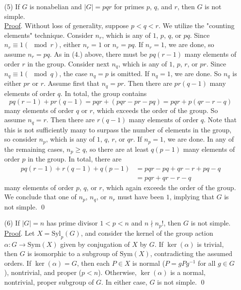 \documentclass[11pt]{amsart}
\theoremstyle{definition}
\renewenvironment{proof}{\underline{Proof}.}{\qed}
\renewcommand\geq{\geqslant}
\renewcommand\:{\colon}
\newcommand{\1}{\mathds{1}}
\newcommand{\Syl}{\text{Syl}}
\newcommand{\Sym}{\text{Sym}}
\begin{document}
\begin{enumerate}[leftmargin=*]
\begin{proof}
\end{proof}
\item[(5)] If $G$ is nonabelian and $|G| = pqr$ for primes $p$, $q$, and $r$, then $G$ is not simple. \\
\begin{proof}
	Without loss of generality, suppose $p < q < r$. We utilize the "counting elements" technique. Consider $n_r$, which is any of $1$, $p$, $q$, or $pq$. Since $n_r \equiv 1 (\mod r)$, either $n_r = 1$ or $n_r = pq$. If $n_r = 1$, we are done, so assume $n_r = pq$. As in (4.) above, there must be $pq(r-1)$ many elements of order $r$ in the group. Consider next $n_q$, which is any of $1$, $p$, $r$, or $pr$. Since $n_q \equiv 1 (\mod q)$, the case $n_q = p$ is omitted. If $n_q = 1$, we are done. So $n_q$ is either $pr$ or $r$. Assume first that $n_q = pr$. Then there are $pr(q-1)$ many elements of order $q$. In total, the group contains
		\[ pq(r-1) + pr(q-1) = pqr + (pqr - pr- pq) = pqr + p(qr - r - q) \]
	many elements of order $q$ or $r$, which exceeds the order of the group. So assume $n_q = r$. Then there are $r(q - 1)$ many elements of order $q$. Note that this is not sufficiently many to surpass the number of elements in the group, so consider $n_p$, which is any of $1$, $q$, $r$, or $qr$. If $n_p = 1$, we are done. In any of the remaining cases, $n_p \geq q$, so there are at least $q(p - 1)$ many elements of order $p$ in the group. In total, there are
	\begin{align*}
		pq(r - 1) + r(q - 1) + q(p - 1) &= pqr - pq + qr - r + pq - q \\
		&= pqr + qr - r - q
	\end{align*}
	many elements of order $p$, $q$, or $r$, which again exceeds the order of the group. We conclude that one of $n_p$, $n_q$, or $n_r$ must have been $1$, implying that $G$ is not simple.
\end{proof}
\item[(6)] If $|G| = n$ has prime divisor $1 < p < n$ and $n \nmid n_p!$, then $G$ is not simple. \\
\begin{proof}
	Let $X = \Syl_p(G)$, and consider the kernel of the group action $\alpha\: G \to \Sym(X)$ given by conjugation of $X$ by $G$. If $\ker(\alpha)$ is trivial, then $G$ is isomorphic to a subgroup of $\Sym(X)$, contradicting the assumed orders. If $\ker(\alpha) = G$, then each $P \in X$ is normal ($P = gPg^{-1}$ for all $g \in G$), nontrivial, and proper ($p < n$). Otherwise, $\ker(\alpha)$ is a normal, nontrivial, proper subgroup of $G$. In either case, $G$ is not simple.
\end{proof}
\end{enumerate}
\vskip5pt
\end{document}
